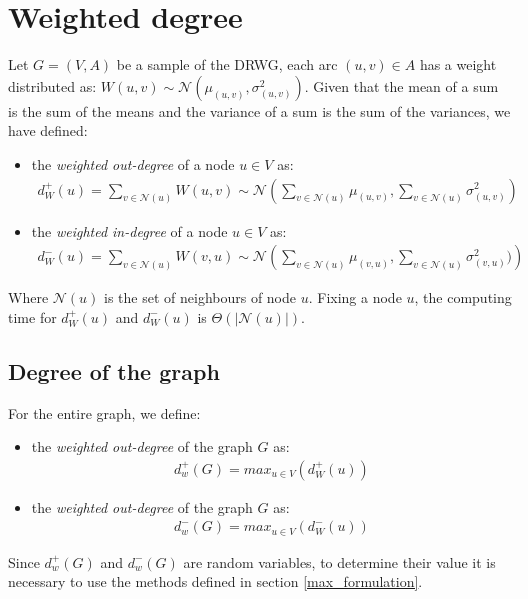 \section{Weighted degree}
Let \( G = (V, A) \) be a sample of the DRWG, each arc \( (u, v) \in A \) has a weight distributed as: $W(u, v) \sim \mathcal{N}(\mu_{(u, v)}, \sigma^2_{(u, v)})$.
Given that the mean of a sum is the sum of the means and the variance of a sum is the sum of the variances, we have defined:
\begin{itemize}
	\item the \textit{weighted out-degree} of a node $u\in V$ as:
	\begin{align*}
		d_W^+(u) = \sum_{v \in \mathcal{N}(u)} W(u, v) \sim \mathcal{N} \left( \sum_{v \in \mathcal{N}(u)} \mu_{(u, v)}, \sum_{v \in \mathcal{N}(u)} \sigma^2_{(u, v)}\right)
	\end{align*}
	\item the \textit{weighted in-degree} of a node $u\in V$ as:
	\begin{align*}
		d_W^-(u) = \sum_{v \in \mathcal{N}(u)} W(v, u) \sim \mathcal{N}\left(\sum_{v \in \mathcal{N}(u)} \mu_{(v, u)}, \sum_{v \in \mathcal{N}(u)} \sigma^2_{(v, u)})\right)
	\end{align*}
\end{itemize}

Where $\mathcal{N}(u)$ is the set of neighbours of node $u$.
Fixing a node $u$, the computing time for $d_W^+(u)$ and $d_W^-(u)$ is $\Theta(|\mathcal{N}(u)|)$.

\subsection{Degree of the graph}
For the entire graph, we define:
\begin{itemize}
	\item the \textit{weighted out-degree} of the graph $G$ as:
	\begin{align*}
		d^+_w(G) = max_{u\in V}(d_W^+(u))
	\end{align*}
	\item the \textit{weighted out-degree} of the graph $G$ as:
	\begin{align*}
		d^-_w(G) = max_{u\in V}(d_W^-(u))
	\end{align*}
\end{itemize}
Since $d^+_w(G)$ and $d^-_w(G)$ are random variables, to determine their value it is necessary to use the methods defined in section \ref{max_formulation}.




